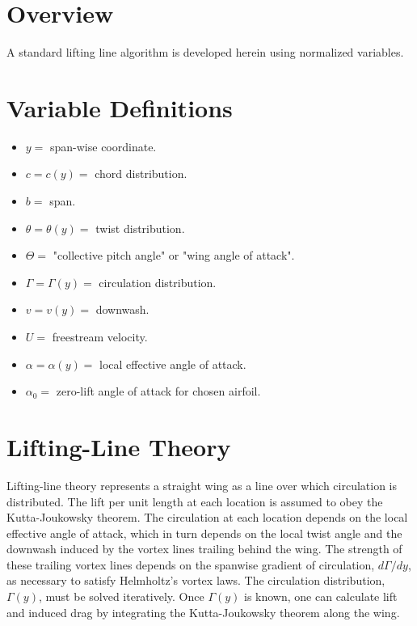 \documentclass[11pt,letter]{ejlnotes}
\renewcommand{\lecttopic}{Lifting-Line Theory}
\begin{document}
	\thispagestyle{fancy}
	
	
	{\bodyfont  %

		
		\section*{Overview}

		A standard lifting line algorithm is developed herein using normalized variables.
		
		
		\section*{Variable Definitions}
		
		\begin{itemize}
			\item $y = $ span-wise coordinate.
			\item $c = c(y) = $ chord distribution.
			\item $b = $ span.
			\item $\theta = \theta(y) = $ twist distribution.
			\item $\Theta = $ "collective pitch angle" or "wing angle of attack".
			\item $\Gamma = \Gamma(y) = $ circulation distribution. 
			\item $v = v(y) = $ downwash.
			\item $U = $ freestream velocity.
			\item $\alpha = \alpha(y) = $ local effective angle of attack.
			\item $\alpha_0 = $ zero-lift angle of attack for chosen airfoil.
		\end{itemize}

		
		\section*{Lifting-Line Theory}
		
		Lifting-line theory represents a straight wing as a line over which circulation is distributed.  The lift per unit length at each location is assumed to obey the Kutta-Joukowsky theorem.  The circulation at each location depends on the local effective angle of attack, which in turn depends on the local twist angle and the downwash induced by the vortex lines trailing behind the wing.  The strength of these trailing vortex lines depends on the spanwise gradient of circulation, $d\Gamma/dy$, as necessary to satisfy Helmholtz's vortex laws.  The circulation distribution, $\Gamma(y)$, must be solved iteratively.  Once $\Gamma(y)$ is known, one can calculate lift and induced drag by integrating the Kutta-Joukowsky theorem along the wing.
		
}
\end{document}

